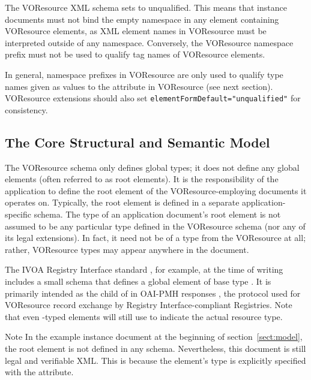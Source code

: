 \documentclass[11pt,a4paper]{ivoa}
\begin{document}
The VOResource XML schema sets  to
unqualified.  This means that
instance documents must not bind the
empty namespace in any element containing
VOResource elements, as XML element names in VOResource must be
interpreted outside of any namespace.
Conversely, the VOResource namespace prefix must not
be used to qualify tag names of VOResource elements.

In general, namespace prefixes in VOResource are
only used to qualify type names given as values to the 
attribute in VOResource (see next section).  VOResource extensions
should also set \verb|elementFormDefault="unqualified"| for consistency.



\subsection{The Core Structural and Semantic Model}
\label{sect:core}

The VOResource schema only defines global types; it does not define
any global elements (often referred to as root elements).  It is the
responsibility of the application to define the root element of the
VOResource-employing documents it operates on.  Typically, the root
element is defined in a separate application-specific schema.  The
type of an application document's root element is not assumed to be
any particular type defined in the VOResource schema (nor any of its
legal extensions).  In fact, it need not be of a type from the
VOResource at all; rather, VOResource types may appear anywhere in the
document.

The IVOA Registry Interface standard \citep{2018ivoa.spec.0723D},
for example, at the time of writing includes a small schema that defines
a global element  of base type
.  It is primarily intended as the child of
 in OAI-PMH responses \citep{std:oaipmh}, the protocol
used for VOResource record exchange by Registry Interface-compliant
Registries.  Note that even
-typed elements will still use  to
indicate the actual resource type.

\begin{admonition}{Note}
In the example instance
document at the beginning of section~\ref{sect:model}, the root element
 is not defined in any schema.
Nevertheless, this document is still legal and verifiable XML.
This is because the element's type is explicitly specified with
the  attribute.
\end{admonition}
\end{document}
